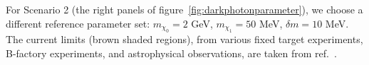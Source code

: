 For Scenario 2 (the right panels of figure~\ref{fig:darkphotonparameter}), we choose a different reference parameter set: $m_{\chi_0} = 2$ GeV, $m_{\chi_1} = 50$ MeV, $\delta m = 10$ MeV. 
The current limits (brown shaded regions), from various fixed target experiments, B-factory experiments, and astrophysical observations, are taken from ref.~\cite{Banerjee:2018vgk}.



